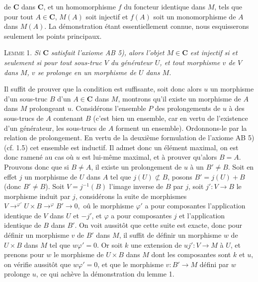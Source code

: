 
\noindent de $\mathbf{C}$ dans $\mathbf{C}$, et un homomorphisme $f$ du foncteur identique dans
$M$, tels que pour tout $A\in \mathbf{C}$, $M(A)$ soit injectif et $f(A)$ soit un
monomorphisme de $A$ dans $M(A)$. La démonstration étant essentiellement
connue, nous esquisserons seulement les points principaux.

\textsc{Lemme 1.} \textit{Si $\mathbf{C}$ satisfait l'axiome \textup{AB 5)}, alors
l'objet $M\in \mathbf{C}$ est injectif si et seulement si pour tout sous-truc $V$ du
générateur $U$, et tout morphisme $v$ de $V$ dans $M$, $v$ se prolonge en un
morphisme de $U$ dans $M$.}

Il suffit de prouver que la condition est suffisante, soit donc alors $u$ un
morphisme d'un sous-truc $B$ d'un $A\in \mathbf{C}$ dans $M$, montrons qu'il existe un
morphisme de $A$ dans $M$ prolongeant $u$. Considérons l'ensemble $P$ des
prolongements de $u$ à des sous-trucs de $A$ contenant $B$ (c'est bien un
ensemble, car en vertu de l'existence d'un générateur, les sous-trucs de $A$
forment un ensemble). Ordonnons-le par la relation de prolongement. En vertu
de la deuxième formulation de l'axiome AB 5) (cf. 1.5) cet ensemble est
inductif. Il admet donc un élément maximal, on est donc ramené au cas où $u$
est lui-même maximal, et à prouver qu'alors $B=A$.
Prouvons donc que si $B\neq A$, il existe un prolongement de $u$ à un
$B'\neq B$. Soit en effet $j$ un morphisme de $U$ dans $A$ tel que
$j(U)\not\subset B$, posons $B'=j(U)+B$ (donc $B'\neq B$). Soit
$V=j^{-1}(B)$ l'image inverse de $B$ par $j$, soit
$j':V\to B$ le morphisme induit par $j$, considérons la suite de
morphismes
$V\mathrel{\mathop{\to}^{\varphi'}}U\times B  \mathrel{\mathop{\to}^{\varphi}}B'\to0,$ oû le morphisme $\varphi'$ a pour composantes l'application
identique de $V$ dans $U$ et $-j'$, et $\varphi$ a pour composantes $j$ et
l'application identique de $B$ dans $B'$. On voit aussitôt que cette suite est
exacte, donc pour définir un morphisme $v$ de $B'$ dans $M$, il suffit de
définir un morphisme $w$ de $U\times B$ dans $M$ tel que
$w\varphi'=0$. Or soit $k$ une extension de $uj':V\to M$ à $U$,
et prenons pour $w$ le morphisme de $U\times B$ dans $M$ dont les composantes
sont $k$ et $u$, on vérifie aussitôt que $w\varphi'=0$, et que le morphisme
$v:B'\to M$ défini par $w$ prolonge $u$, ce qui achève la
démonstration du lemme 1.

